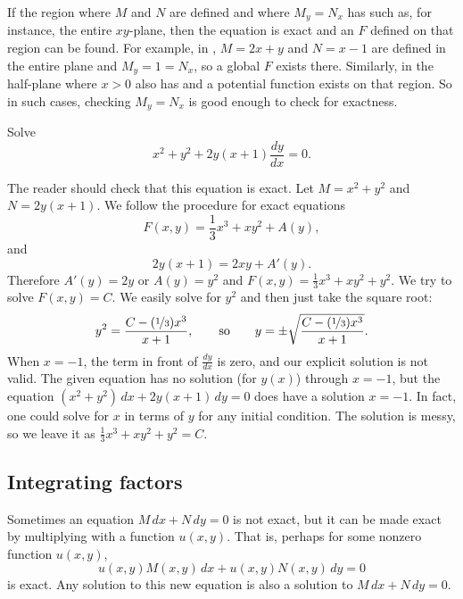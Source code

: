 If the region where $M$ and $N$ are defined and where $M_y=N_x$
has  such as, for instance, the entire $xy$-plane,
then the equation is exact and an $F$ defined on that region can be found.
For example, in ,
$M=2x+y$ and $N=x-1$ are defined in the entire plane and
$M_y = 1 = N_x$, so a global $F$ exists there.
Similarly, in 
the half-plane where $x > 0$ also has 
and a potential function exists on that region.
So in such cases, checking
$M_y = N_x$ is good enough to check for exactness.

\begin{example} \label{exact:exampleabove}
Solve
\begin{equation*}
x^2+y^2 + 2y(x+1) \frac{dy}{dx} = 0 .
\end{equation*}

The reader should check that this equation is exact.
Let $M= x^2+y^2$ and $N=2y(x+1)$.
We follow the procedure for exact equations
\begin{equation*}
F(x,y) = \frac{1}{3}x^3 + xy^2 + A(y) ,
\end{equation*}
and
\begin{equation*}
2y(x+1) = 2xy + A'(y) .
\end{equation*}
Therefore $A'(y) = 2y$ or $A(y) = y^2$ and $F(x,y) = \frac{1}{3}x^3 + xy^2 +
y^2$.
We try to solve $F(x,y) = C$.  We easily solve for $y^2$ and then just take
the square root:
\begin{equation*}
y^2 = \frac{C-(\nicefrac{1}{3})x^3}{x+1},
\qquad \text{so} \qquad
y = \pm \sqrt{\frac{C-(\nicefrac{1}{3})x^3}{x+1}} .
\end{equation*}
When $x=-1$, the term in front of $\frac{dy}{dx}$ is zero,
and our explicit solution is not valid.
The given equation has no solution (for $y(x)$) through $x=-1$, but
the equation $(x^2+y^2) \, dx + 2y(x+1) \, dy = 0$ does have
a solution $x=-1$.  In fact, one could solve for $x$ in terms
of $y$ for any initial condition.  The solution is messy,
so we leave it as $\frac{1}{3}x^3 + xy^2 + y^2 = C$.
\end{example}

\subsection{Integrating factors}

Sometimes an equation $M\, dx + N \, dy = 0$ is not exact, but it can be
made exact by multiplying with a function $u(x,y)$.  That is, perhaps
for some nonzero function $u(x,y)$,
\begin{equation*}
u(x,y) M(x,y) \, dx + u(x,y) N(x,y) \, dy = 0
\end{equation*}
is exact.  Any solution to this new equation is also a solution to
$M\, dx + N \, dy = 0$.

